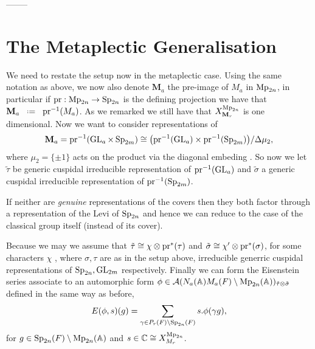     --------

    \begin{Theorem}
        
    \end{Theorem}

    


    \section{The Metaplectic Generalisation}
    We need to restate the setup now in the metaplectic case. Using the same notation as above, we now also denote \(\mathbf{M}_a\) the pre-image of \(M_a\) in \(\operatorname{Mp}_{2n}\), in particular if \(\mathrm{pr}: \operatorname{Mp}_{2n} \to \operatorname{Sp}_{2n}\) is the defining projection we have that \(\mathbf{M}_a \defeq \mathrm{pr}\inv(M_a)\). As we remarked  we still have that \(X_{\mathbf{M}_r}^{\operatorname{Mp}_{2n}}\) is one dimensional. Now we want to consider representations of 
    \[\mathbf{M}_a = \mathrm{pr}^{-1}(\operatorname{GL}_a \times \operatorname{Sp}_{2m}) \cong \big(\mathrm{pr}^{-1}(\operatorname{GL}_a)\times \mathrm{pr}^{-1}(\operatorname{Sp}_{2m})\big)/\Delta \mu_2,\]
    where \(\mu_2 = \{\pm 1\}\) acts on the product via the diagonal embeding .
    So now we let \(\tilde{\tau}\) be generic cuspidal irreducible representation of \(\mathrm{pr}^{-1}(\operatorname{GL}_a)\) and \(\tilde{\sigma}\) a generic cuspidal irreducible representation of \(\mathrm{pr}^{-1}(\operatorname{Sp}_{2m})\). 

    \begin{remark}
        If neither are \textit{genuine} representations of the covers then they both factor through a representation of the Levi of \(\operatorname{Sp}_{2n}\) and hence we can reduce to the case of the classical group itself (instead of its cover).
    \end{remark}

    Because we may  we assume that \(\tilde{\tau} \cong \chi\otimes \mathrm{pr}^*(\tau)\) and \(\tilde{\sigma} \cong \chi'\otimes \mathrm{pr}^*(\sigma)\), for some characters \(\chi\) , where \(\sigma, \tau\) are as in the setup above, irreducible generric cuspidal representations of \(\operatorname{Sp}_{2n}, \operatorname{GL}_{2m}\) respectively.
    Finally we can form the Eisenstein series associate to an automorphic form \(\phi\in \mathcal{A}(N_a(\A)M_a(F)\setminus \Mp_{2n}(\A) )_{\tilde{\tau}\tensor \tilde\sigma}\) defined in the same way as before,
    \[E(\phi, s)(g) = \sum_{\gamma\in P_r(F) \setminus \Sp_{2n}(F)} s.\phi(\gamma g),\]
    for \(g\in \Sp_{2n}(F) \setminus \Mp_{2n}(\A)\) and \(s\in \C \cong X^{\Mp_{2n}}_{M_r}\).

